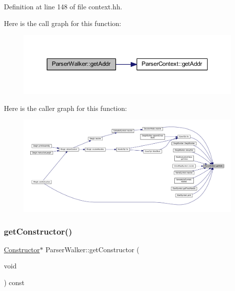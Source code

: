 Definition at line 148 of file context.\+hh.

Here is the call graph for this function\+:
\nopagebreak
\begin{figure}[H]
\begin{center}
\leavevmode
\includegraphics[width=350pt]{class_parser_walker_a3a5e36992af804c2ece1febb3d0e6691_cgraph}
\end{center}
\end{figure}
Here is the caller graph for this function\+:
\nopagebreak
\begin{figure}[H]
\begin{center}
\leavevmode
\includegraphics[width=350pt]{class_parser_walker_a3a5e36992af804c2ece1febb3d0e6691_icgraph}
\end{center}
\end{figure}
\mbox{\label{class_parser_walker_a3d8f48e605938ba8faef8a92cb816b4f}} 
\subsubsection{\texorpdfstring{getConstructor()}{getConstructor()}}
{\footnotesize\ttfamily \mbox{\hyperlink{class_constructor}{Constructor}}$\ast$ Parser\+Walker\+::get\+Constructor (\begin{DoxyParamCaption}\item[{void}]{ }\end{DoxyParamCaption}) const\hspace{0.3cm}{\ttfamily [inline]}}



